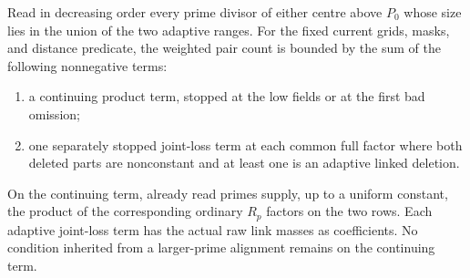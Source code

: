\begin{lemma}
\label{join:backward-decomposition}
Read in decreasing order every prime divisor of either centre above
$P_0$ whose size lies in the union of the two adaptive ranges. For the
fixed current grids, masks, and distance
predicate, the weighted pair count is bounded by the sum of the
following nonnegative terms:
\begin{enumerate}
\item a continuing product term, stopped at the low fields or at the
first bad omission;
\item one separately stopped joint-loss term at each common full factor
where both deleted parts are nonconstant and at least one is an
adaptive linked deletion.
\end{enumerate}
On the continuing term, already read primes supply, up to a uniform
constant, the product of the corresponding ordinary $R_p$ factors on
the two rows. Each adaptive joint-loss term has the actual raw link
masses as coefficients. No condition inherited from a larger-prime
alignment remains on the continuing term.
\end{lemma}

